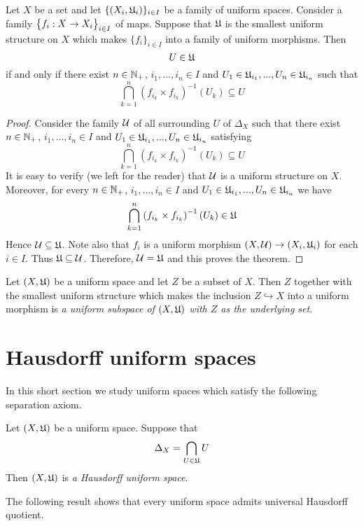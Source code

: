 \begin{theorem}\label{theorem:description_of_uniform_structure_introduced_by_a_family_of_maps}
Let $X$ be a set and let $\{(X_i,{\mathfrak U}_i)\}_{i\in I}$ be a family of uniform spaces. Consider a family $\big\{f_i:X\rightarrow X_i\big\}_{i\in I}$ of maps. Suppose that ${\mathfrak U}$ is the smallest uniform structure on $X$ which makes $\{f_i\}_{i\in I}$ into a family of uniform morphisms. Then 
$$U \in {\mathfrak U}$$
if and only if there exist $n\in {\mathbb N}_+$, $i_1,...,i_n\in I$ and $U_1 \in {\mathfrak U}_{i_1},...,U_n\in {\mathfrak U}_{i_n}$ such that
$$\bigcap_{k=1}^n\left(f_{i_k}\times f_{i_k}\right)^{-1}(U_k) \subseteq U$$
\end{theorem}
\begin{proof}
Consider the family ${\mathcal U}$ of all surrounding $U$ of $\Delta_X$ such that there exist $n\in {\mathbb N}_+$, $i_1,...,i_n\in I$ and $U_1 \in {\mathfrak U}_{i_1},...,U_n\in {\mathfrak U}_{i_n}$ satisfying
$$\bigcap_{k=1}^n\left(f_{i_k}\times f_{i_k}\right)^{-1}(U_k) \subseteq U$$
It is easy to verify (we left for the reader) that ${\mathcal U}$ is a uniform structure on $X$. Moreover, for every $n\in {\mathbb N}_+$, $i_1,...,i_n\in I$ and $U_1 \in {\mathfrak U}_{i_1},...,U_n\in {\mathfrak U}_{i_n}$ we have
$$\bigcap_{k=1}^n\left(f_{i_k}\times f_{i_k}\right)^{-1}(U_k) \in {\mathfrak U}$$
Hence ${\mathcal U} \subseteq {\mathfrak U}$. Note also that $f_i$ is a uniform morphism $(X,{\mathcal U})\rightarrow (X_i,{\mathfrak U}_i)$ for each $i\in I$. Thus ${\mathfrak U} \subseteq {\mathcal U}$. Therefore, ${\mathcal U} = {\mathfrak U}$ and this proves the theorem. 
\end{proof}

\begin{definition}
Let $(X,{\mathfrak U})$ be a uniform space and let $Z$ be a subset of $X$. Then $Z$ together with the smallest uniform structure which makes the inclusion $Z\hookrightarrow X$ into a uniform morphism is \textit{a uniform subspace of $(X,{\mathfrak U})$ with $Z$ as the underlying set}.
\end{definition}

\section{Hausdorff uniform spaces}
\noindent
In this short section we study uniform spaces which satisfy the following separation axiom. 

\begin{definition}
Let $(X,{\mathfrak U})$ be a uniform space. Suppose that
$$\Delta_X = \bigcap_{U\in {\mathfrak U}}U$$
Then $(X,{\mathfrak U})$ is \textit{a Hausdorff uniform space}.
\end{definition}
\noindent
The following result shows that every uniform space admits universal Hausdorff quotient.

